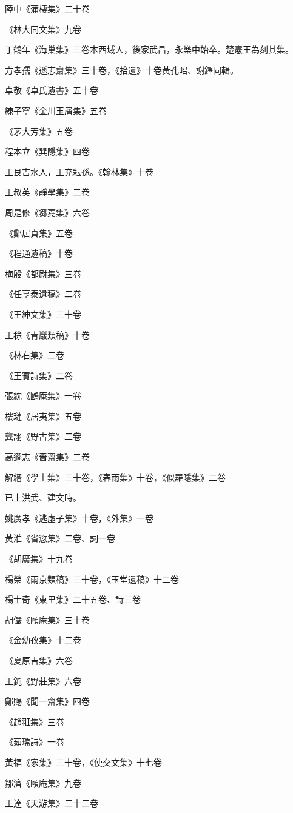 陸中《蒲棲集》二十卷

《林大同文集》九卷

丁鶴年《海巢集》三卷本西域人，後家武昌，永樂中始卒。楚憲王為刻其集。

方孝孺《遜志齋集》三十卷，《拾遺》十卷黃孔昭、謝鐸同輯。

卓敬《卓氏遺書》五十卷

練子寧《金川玉屑集》五卷

《茅大芳集》五卷

程本立《巽隱集》四卷

王艮吉水人，王充耘孫。《翰林集》十卷

王叔英《靜學集》二卷

周是修《芻蕘集》六卷

《鄭居貞集》五卷

《程通遺稿》十卷

梅殷《都尉集》三卷

《任亨泰遺稿》二卷

《王紳文集》三十卷

王稌《青巖類稿》十卷

《林右集》二卷

《王賓詩集》二卷

張紞《鶠庵集》一卷

樓璉《居夷集》五卷

龔詡《野古集》二卷

高遜志《嗇齋集》二卷

解縉《學士集》三十卷，《春雨集》十卷，《似羅隱集》二卷

已上洪武、建文時。

姚廣孝《逃虛子集》十卷，《外集》一卷

黃淮《省愆集》二卷、詞一卷

《胡廣集》十九卷

楊榮《兩京類稿》三十卷，《玉堂遺稿》十二卷

楊士奇《東里集》二十五卷、詩三卷

胡儼《頤庵集》三十卷

《金幼孜集》十二卷

《夏原吉集》六卷

王鈍《野莊集》六卷

鄭賜《聞一齋集》四卷

《趙羾集》三卷

《茹瑺詩》一卷

黃福《家集》三十卷，《使交文集》十七卷

鄒濟《頤庵集》九卷

王達《天游集》二十二卷

